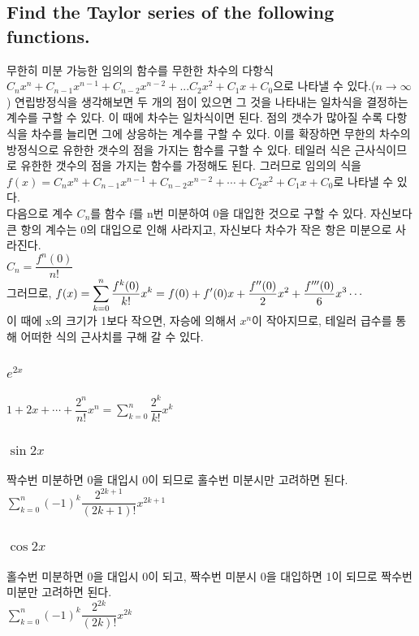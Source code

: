 \documentclass[12pt,a4paper]{article}
\begin{document}
\subsection{Find the Taylor series of the following functions.}  
무한히 미분 가능한 임의의 함수를 무한한 차수의 다항식 
$C_nx^n+C_{n-1}x^{n-1}+C_{n-2}x^{n-2}+ ... C_2x^2+C_1x + C_0$으로 나타낼 수 있다.($n \rightarrow \infty$)
연립방정식을 생각해보면 두 개의 점이 있으면 그 것을 나타내는 일차식을 결정하는 계수를 구할 수 있다. 이 때에 차수는 일차식이면 된다. 점의 갯수가 많아질 수록 다항식을 차수를 늘리면 그에 상응하는 계수를 구할 수 있다. 이를 확장하면 무한의 차수의 방정식으로 유한한 갯수의 점을 가지는 함수를 구할 수 있다. 테일러 식은 근사식이므로 유한한 갯수의 점을 가지는 함수를 가정해도 된다. 그러므로 임의의 식을 \\
$f(x) = C_nx^n+C_{n-1}x^{n-1}+C_{n-2}x^{n-2}+ \cdots +C_2x^2+C_1x + C_0$로 나타낼 수 있다.\\
다음으로 계수 $C_n$를 함수 f를 n번 미분하여 0을 대입한 것으로 구할 수 있다. 자신보다 큰 항의 계수는 0의 대입으로 인해 사라지고, 자신보다 차수가 작은 항은 미분으로 사라진다.\\
$C_n = \dfrac{f^n(0)}{n!}$\\
그러므로, $f(x)=\displaystyle\sum_{k=0}^n \dfrac{f^k(0)}{k!}x^k \\
= f(0) + f'(0)x+ \dfrac{f''(0)}{2}x^2 + \dfrac{f'''(0)}{6}x^3 \cdots$\\
이 때에 x의 크기가 1보다 작으면, 자승에 의해서 $x^n$이 작아지므로, 테일러 급수를 통해 어떠한 식의 근사치를 구해 갈 수 있다.
\subsubsection{$e^{2x}$}
$1 + 2x + \cdots + \dfrac{2^n}{n!}x^n = \displaystyle\sum_{k=0}^n\dfrac{2^k}{k!}x^k$
\subsubsection{$\sin{2x}$}
짝수번 미분하면 0을 대입시 0이 되므로 홀수번 미분시만 고려하면 된다.\\
$\displaystyle\sum_{k=0}^n(-1)^k\dfrac{2^{2k+1}}{(2k+1)!}x^{2k+1}$
\subsubsection{$\cos{2x}$}
홀수번 미분하면 0을 대입시 0이 되고, 짝수번 미분시 0을 대입하면 1이 되므로 짝수번 미분만 고려하면 된다.\\
$\displaystyle\sum_{k=0}^{n}(-1)^{k}\dfrac{2^{2k}}{(2k)!}x^{2k}$
\end{document}
